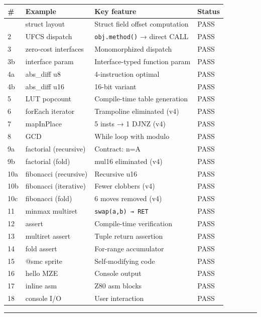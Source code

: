 \documentclass[
  11pt,
  a4paper,
]{report}
\begin{document}
\begin{longtable}[]{@{}llll@{}}
\toprule\noalign{}
\# & Example & Key feature & Status \\
\midrule\noalign{}
\endhead
\bottomrule\noalign{}
\endlastfoot
1 & struct layout & Struct field offset computation & PASS \\
2 & UFCS dispatch & \texttt{obj.method()} → direct CALL & PASS \\
3 & zero-cost interfaces & Monomorphized dispatch & PASS \\
3b & interface param & Interface-typed function param & PASS \\
4a & abs\_diff u8 & 4-instruction optimal & PASS \\
4b & abs\_diff u16 & 16-bit variant & PASS \\
5 & LUT popcount & Compile-time table generation & PASS \\
6 & forEach iterator & Trampoline eliminated (v4) & PASS \\
7 & mapInPlace & 5 insts → 1 DJNZ (v4) & PASS \\
8 & GCD & While loop with modulo & PASS \\
9a & factorial (recursive) & Contract: n=A & PASS \\
9b & factorial (fold) & mul16 eliminated (v4) & PASS \\
10a & fibonacci (recursive) & Recursive u16 & PASS \\
10b & fibonacci (iterative) & Fewer clobbers (v4) & PASS \\
10c & fibonacci (fold) & 6 moves removed (v4) & PASS \\
11 & minmax multiret & \texttt{swap(a,b)\ →\ RET} & PASS \\
12 & assert & Compile-time verification & PASS \\
13 & multiret assert & Tuple return assertion & PASS \\
14 & fold assert & For-range accumulator & PASS \\
15 & @smc sprite & Self-modifying code & PASS \\
16 & hello MZE & Console output & PASS \\
17 & inline asm & Z80 asm blocks & PASS \\
18 & console I/O & User interaction & PASS \\
\end{longtable}

\begin{center}\rule{0.5\linewidth}{0.5pt}\end{center}
\end{document}
